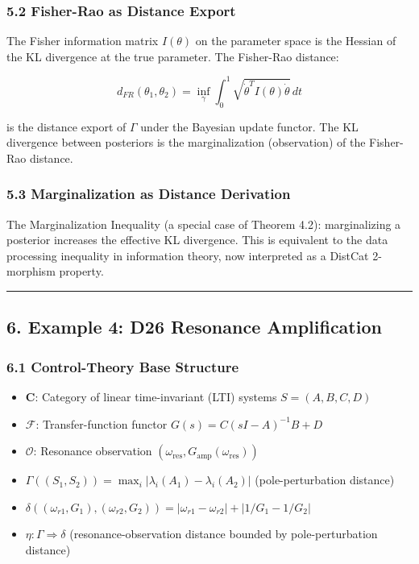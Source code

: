 \documentclass[
]{article}
\providecommand{\tightlist}{%
  \setlength{\itemsep}{0pt}\setlength{\parskip}{0pt}}
\begin{document}
\subsubsection{5.2 Fisher-Rao as Distance
Export}\label{fisher-rao-as-distance-export}

The Fisher information matrix \(I(\theta)\) on the parameter space is
the Hessian of the KL divergence at the true parameter. The Fisher-Rao
distance:

\[d_{FR}(\theta_1, \theta_2) = \inf_{\gamma} \int_0^1 \sqrt{\dot{\theta}^T I(\theta) \dot{\theta}} \, dt\]

is the distance export of \(\Gamma\) under the Bayesian update functor.
The KL divergence between posteriors is the marginalization
(observation) of the Fisher-Rao distance.

\subsubsection{5.3 Marginalization as Distance
Derivation}\label{marginalization-as-distance-derivation}

The Marginalization Inequality (a special case of Theorem 4.2):
marginalizing a posterior increases the effective KL divergence. This is
equivalent to the data processing inequality in information theory, now
interpreted as a DistCat 2-morphism property.

\begin{center}\rule{0.5\linewidth}{0.5pt}\end{center}

\subsection{6. Example 4: D26 Resonance
Amplification}\label{example-4-d26-resonance-amplification}

\subsubsection{6.1 Control-Theory Base
Structure}\label{control-theory-base-structure}

\begin{itemize}
\tightlist
\item
  \(\mathbf{C}\): Category of linear time-invariant (LTI) systems
  \(S = (A, B, C, D)\)
\item
  \(\mathcal{F}\): Transfer-function functor
  \(G(s) = C(sI - A)^{-1}B + D\)
\item
  \(\mathcal{O}\): Resonance observation
  \((\omega_{\text{res}}, G_{\text{amp}}(\omega_{\text{res}}))\)
\item
  \(\Gamma((S_1, S_2)) = \max_i |\lambda_i(A_1) - \lambda_i(A_2)|\)
  (pole-perturbation distance)
\item
  \(\delta((\omega_{r1}, G_1), (\omega_{r2}, G_2)) = |\omega_{r1} - \omega_{r2}| + |1/G_1 - 1/G_2|\)
\item
  \(\eta: \Gamma \Rightarrow \delta\) (resonance-observation distance
  bounded by pole-perturbation distance)
\end{itemize}
\end{document}
